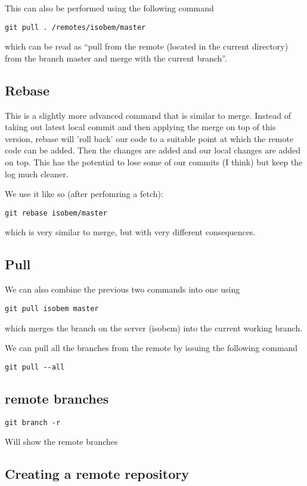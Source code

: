 \documentclass[a4paper, 10pt]{article}
\begin{document}
This can also be performed using the following command
\begin{verbatim}
git pull . /remotes/isobem/master
\end{verbatim}
which can be read as ``pull from the remote (located in the current
directory) from the branch master and merge with the current branch''.

\subsection*{Rebase}
\label{sec:rebase}

This is a slightly more advanced command that is similar to
merge. Instead of taking out latest local commit and then applying the
merge on top of this version, rebase will 'roll back' our code to a
suitable point at which the remote code can be added. Then the changes
are added and our local changes are added on top. This has the
potential to lose some of our commits (I think) but keep the log much
cleaner.

We use it like so (after perfomring a fetch):
\begin{verbatim}
git rebase isobem/master
\end{verbatim}
which is very similar to merge, but with very different consequences. 


\subsection*{Pull}
\label{sec:pull}

We can also combine the previous two commands into one using 
\begin{verbatim}
git pull isobem master
\end{verbatim}
which merges the branch on the server (isobem) into the current
working branch. 

We can pull all the branches from the remote by issuing the following
command 
\begin{verbatim}
git pull --all
\end{verbatim}

\subsection*{remote branches}
\begin{Verbatim}
git branch -r
\end{Verbatim}
Will show the remote branches


\subsection{Creating a remote repository}
\label{sec:creat-remote-repos}
\end{document}
